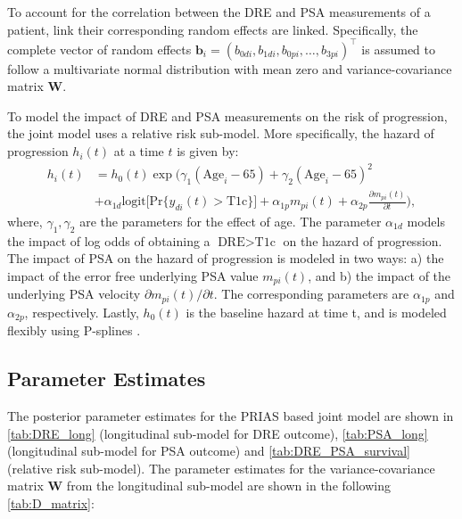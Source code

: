 To account for the correlation between the DRE and PSA measurements of a patient, link their corresponding random effects are linked. Specifically, the complete vector of random effects ${\boldsymbol{b}_i = (b_{0di}, b_{1di}, b_{0pi}, \ldots, b_{3pi})^\top}$ is assumed to follow a multivariate normal distribution with mean zero and variance-covariance matrix $\boldsymbol{W}$.

To model the impact of DRE and PSA measurements on the risk of progression, the joint model uses a relative risk sub-model. More specifically, the hazard of progression $h_i(t)$ at a time $t$ is given by:
\begin{equation}
\label{eq:rel_risk_model}
\begin{split}
    h_i(t) &= h_0(t) \exp\Big(\gamma_1 (\mbox{Age}_i-65) + \gamma_2 (\mbox{Age}_i-65)^2\\
    &+\alpha_{1d} \mbox{logit} \big[\mbox{Pr}\{y_{di}(t) > \mbox{T1c}\}\big]+ \alpha_{1p} m_{pi}(t) + \alpha_{2p} \frac{\partial m_{pi}(t)}{\partial {t}}\Big),
    \end{split}
\end{equation}
where, $\gamma_1, \gamma_2$ are the parameters for the effect of age. The parameter $\alpha_{1d}$ models the impact of log odds of obtaining a $\mbox{DRE} > \mbox{T1c}$ on the hazard of progression. The impact of PSA on the hazard of progression is modeled in two ways: a) the impact of the error free underlying PSA value $m_{pi}(t)$, and b) the impact of the underlying PSA velocity $\partial m_{pi}(t)/\partial {t}$. The corresponding parameters are $\alpha_{1p}$ and $\alpha_{2p}$, respectively. Lastly, $h_0(t)$ is the baseline hazard at time t, and is modeled flexibly using P-splines \citep{eilers1996flexible}.

\subsection{Parameter Estimates}
The posterior parameter estimates for the PRIAS based joint model are shown in \ref{tab:DRE_long} (longitudinal sub-model for DRE outcome), \ref{tab:PSA_long} (longitudinal sub-model for PSA outcome) and \ref{tab:DRE_PSA_survival} (relative risk sub-model). The parameter estimates for the variance-covariance matrix $\boldsymbol{W}$ from the longitudinal sub-model are shown in the following \ref{tab:D_matrix}:

